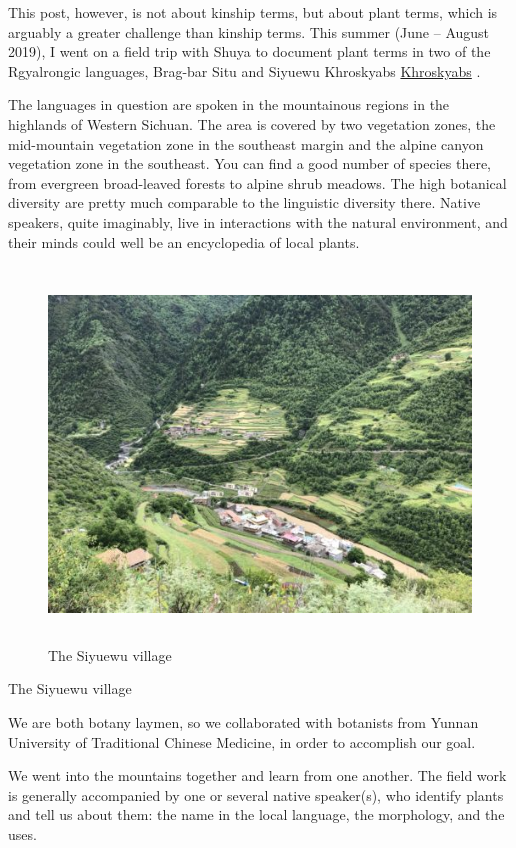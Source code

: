 \documentclass[
  a4paper,
  14pt,
  oneside,
  tablecaptionabove
]{scrbook}
\begin{document}
This post, however, is not about kinship terms, but about plant terms,
which is arguably a greater challenge than kinship terms. This summer
(June -- August 2019), I went on a field trip with Shuya to document
plant terms in two of the Rgyalrongic languages, Brag-bar Situ and
Siyuewu Khroskyabs
\href{https://glottolog.org/resource/languoid/id/siya1242}{Khroskyabs} .

The languages in question are spoken in the mountainous regions in the
highlands of Western Sichuan. The area is covered by two vegetation
zones, the mid-mountain vegetation zone in the southeast margin and the
alpine canyon vegetation zone in the southeast. You can find a good
number of species there, from evergreen broad-leaved forests to alpine
shrub meadows. The high botanical diversity are pretty much comparable
to the linguistic diversity there. Native speakers, quite imaginably,
live in interactions with the natural environment, and their minds could
well be an encyclopedia of local plants.

\leavevmode\hypertarget{attachment_2143}{}%
\begin{figure}
\centering
\includegraphics[width=5.20833in,height=3.90625in]{images/IMG_7199-500x375.jpg}
\caption{The Siyuewu village}
\end{figure}

The Siyuewu village

We are both botany laymen, so we collaborated with botanists from Yunnan
University of Traditional Chinese Medicine, in order to accomplish our
goal.

We went into the mountains together and learn from one another. The
field work is generally accompanied by one or several native speaker(s),
who identify plants and tell us about them: the name in the local
language, the morphology, and the uses.
\end{document}
